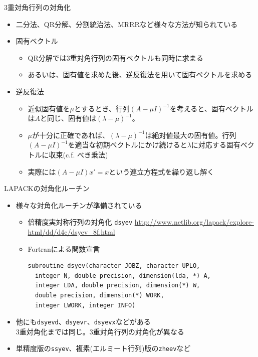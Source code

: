 \documentclass[dvipdfmx]{beamer}
\begin{document}
\begin{frame}[t,fragile]{3重対角行列の対角化}
  \begin{itemize}
  \item 二分法、QR分解、分割統治法、MRRRなど様々な方法が知られている
  \item 固有ベクトル
    \begin{itemize}
    \item QR分解では3重対角行列の固有ベクトルも同時に求まる
    \item あるいは、固有値を求めた後、逆反復法を用いて固有ベクトルを求める
    \end{itemize}
  \item 逆反復法
    \begin{itemize}
    \item 近似固有値を$\mu$とするとき、行列$(A - \mu I)^{-1}$を考えると、固有ベクトルは$A$と同じ、固有値は$(\lambda-\mu)^{-1}$。
    \item $\mu$が十分に正確であれば、$(\lambda-\mu)^{-1}$は絶対値最大の固有値。行列$(A - \mu I)^{-1}$を適当な初期ベクトルにかけ続けると$\lambda$に対応する固有ベクトルに収束(c.f. べき乗法)
    \item 実際には$(A-\mu I) x' = x$という連立方程式を繰り返し解く
    \end{itemize}
  \end{itemize}
\end{frame}

\begin{frame}[t,fragile]{LAPACKの対角化ルーチン}
  \begin{itemize}
  \item 様々な対角化ルーチンが準備されている
    \begin{itemize}
    \item 倍精度実対称行列の対角化 {\tt dsyev}
      \url{http://www.netlib.org/lapack/explore-html/dd/d4c/dsyev_8f.html}
    \item Fortranによる関数宣言
\begin{lstlisting}
subroutine dsyev(character JOBZ, character UPLO,
  integer N, double precision, dimension(lda, *) A,
  integer LDA, double precision, dimension(*) W,
  double precision, dimension(*) WORK,
  integer LWORK, integer INFO)		
\end{lstlisting}
    \end{itemize}
  \item 他にも{\tt dsyevd}、{\tt dsyevr}、{\tt dsyevx}などがある \\
    3重対角化までは同じ。3重対角行列の対角化が異なる
  \item 単精度版の{\tt ssyev}、複素(エルミート行列)版の{\tt zheev}など
  \end{itemize}
\end{frame}
\end{document}
